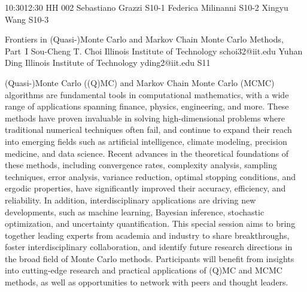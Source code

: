 \documentclass[12pt,lettersize,oneside]{book} %
\begin{document}
\sessionPart{}%
{\hfill{}
{10:30}{12:30} %
{HH 002}} %
{Sebastiano Grazzi}
{S10-1}
{Federica Milinanni}
{S10-2}
{Xingyu Wang}
{S10-3}



\clearpage

\begin{session}
 {Frontiers in (Quasi-)Monte Carlo and Markov Chain Monte Carlo Methods, Part~I}%
 {Sou-Cheng T. Choi}%
 {Illinois Institute of Technology}%
 {schoi32@iit.edu}%
 {Yuhan Ding}%
 {Illinois Institute of Technology}%
 {yding2@iit.edu}%
 {S11}%
{}

 (Quasi-)Monte Carlo ((Q)MC) and Markov Chain Monte Carlo (MCMC) algorithms are fundamental tools in computational mathematics, with a wide range of applications spanning finance, physics, engineering, and more. These methods have proven invaluable in solving high-dimensional problems where traditional numerical techniques often fail, and continue to expand their reach into emerging fields such as artificial intelligence, climate modeling, precision medicine, and data science.
 Recent advances in the theoretical foundations of these methods, including convergence rates, complexity analysis, sampling techniques, error analysis, variance reduction, optimal stopping conditions, and ergodic properties, have significantly improved their accuracy, efficiency, and reliability. In addition, interdisciplinary applications are driving new developments, such as machine learning, Bayesian inference, stochastic optimization, and uncertainty quantification.
 This special session aims to bring together leading experts from academia and industry to share breakthroughs, foster interdisciplinary collaboration, and identify future research directions in the broad field of Monte Carlo methods. Participants will benefit from insights into cutting-edge research and practical applications of (Q)MC and MCMC methods, as well as opportunities to network with peers and thought leaders.
\end{session}
\end{document}
